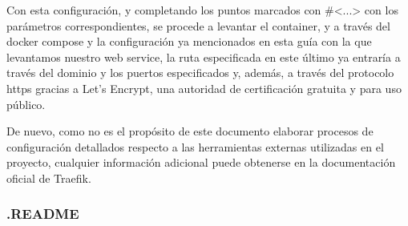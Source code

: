\documentclass{article}
\begin{document}
Con esta configuración, y completando los puntos marcados con \#<...> con los parámetros correspondientes, se procede a levantar el container, y a través del docker compose y la configuración ya mencionados en esta guía con la que levantamos nuestro web service, la ruta especificada en este último ya entraría a través del dominio y los puertos especificados y, además, a través del protocolo https gracias a Let's Encrypt, una autoridad de certificación gratuita y para uso público.

De nuevo, como no es el propósito de este documento elaborar procesos de configuración detallados respecto a las herramientas externas utilizadas en el proyecto, cualquier información adicional puede obtenerse en la documentación oficial de Traefik.\\

\subsubsection{.README}
\end{document}
